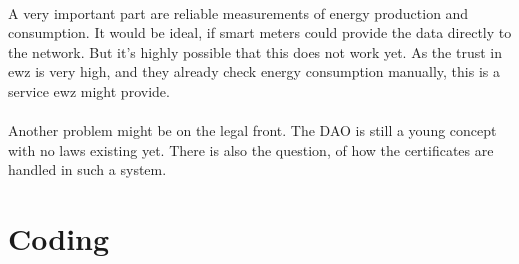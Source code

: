 \documentclass{scrartcl}
\begin{document}
	\paragraph{}
	A very important part are reliable measurements of energy production and consumption. It would be ideal, if smart meters could provide the data directly to the network. But it's highly possible that this does not work yet. As the trust in ewz is very high, and they already check energy consumption manually, this is a service ewz might provide.
	
	\paragraph{}
	Another problem might be on the legal front. The DAO is still a young concept with no laws existing yet. There is also the question, of how the certificates are handled in such a system.  
	
	\section{Coding}
	
	
\end{document}
